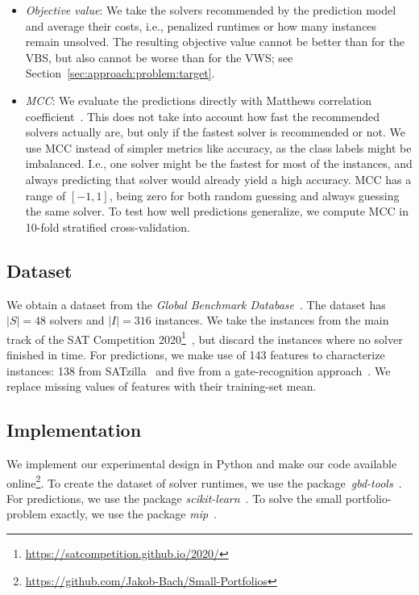 \documentclass[conference]{IEEEtran}
\begin{document}
\begin{itemize}
	\item \emph{Objective value}:
	We take the solvers recommended by the prediction model and average their costs, i.e., penalized runtimes or how many instances remain unsolved.
	The resulting objective value cannot be better than for the VBS, but also cannot be worse than for the VWS; see Section~\ref{sec:approach:problem:target}.
	\item \emph{MCC}:
	We evaluate the predictions directly with Matthews correlation coefficient~\cite{matthews1975comparison, gorodkin2004comparing}.
	This does not take into account how fast the recommended solvers actually are, but only if the fastest solver is recommended or not.
	We use MCC instead of simpler metrics like accuracy, as the class labels might be imbalanced.
	I.e., one solver might be the fastest for most of the instances, and always predicting that solver would already yield a high accuracy.
	MCC has a range of $[-1,1]$, being zero for both random guessing and always guessing the same solver.
	To test how well predictions generalize, we compute MCC in 10-fold stratified cross-validation.
\end{itemize}

\subsection{Dataset}

We obtain a dataset from the \emph{Global Benchmark Database}~\cite{iser2020collaborative}.
The dataset has $|S| = 48$ solvers and $|I| = 316$ instances.
We take the instances from the main track of the SAT Competition 2020\footnote{\url{https://satcompetition.github.io/2020/}}~\cite{balyo2020proceedings}, but discard the instances where no solver finished in time.
For predictions, we make use of 143 features to characterize instances:
138 from SATzilla~\cite{xu2008satzilla, xu2012satzilla2012} and five from a gate-recognition approach~\cite{iser2020recognition}.
We replace missing values of features with their training-set mean.


\subsection{Implementation}

We implement our experimental design in Python and make our code available online\footnote{\url{https://github.com/Jakob-Bach/Small-Portfolios}}.
To create the dataset of solver runtimes, we use the package~\emph{gbd-tools}~\cite{iser2020collaborative}.
For predictions, we use the package \emph{scikit-learn}~\cite{scikit-learn}.
To solve the small portfolio-problem exactly, we use the package \emph{mip}~\cite{python-mip}.
\end{document}
